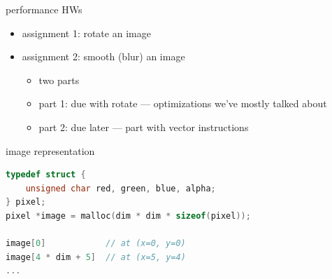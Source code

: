 \begin{frame}[fragile,label=perfAssgn]{performance HWs}
    \begin{itemize}
        \item assignment 1: rotate an image
        \item assignment 2: smooth (blur) an image
            \begin{itemize}
            \item two parts
            \item part 1: due with rotate --- optimizations we've mostly talked about
            \item part 2: due later --- part with vector instructions
            \end{itemize}
    \end{itemize}
\end{frame}

\begin{frame}[fragile,label=imageRep]{image representation}
\begin{lstlisting}[language=C,style=small]
typedef struct { 
    unsigned char red, green, blue, alpha;
} pixel;
pixel *image = malloc(dim * dim * sizeof(pixel));

image[0]            // at (x=0, y=0)
image[4 * dim + 5]  // at (x=5, y=4)
...
\end{lstlisting}
\end{frame}

